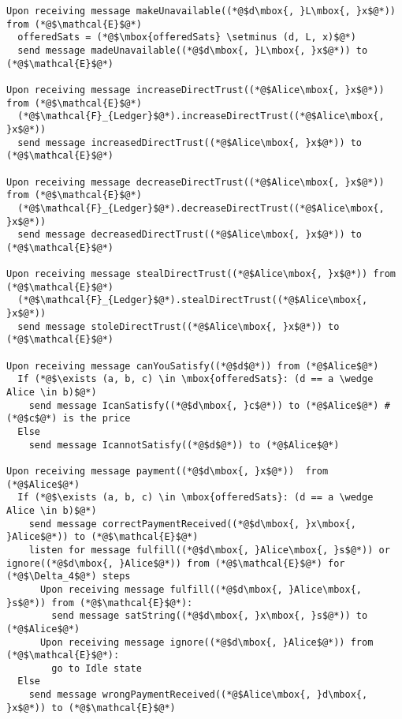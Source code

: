 \begin{lstlisting}[label=protocol, style=numbers]
Upon receiving message makeUnavailable((*@$d\mbox{, }L\mbox{, }x$@*)) from (*@$\mathcal{E}$@*)
  offeredSats = (*@$\mbox{offeredSats} \setminus (d, L, x)$@*)
  send message madeUnavailable((*@$d\mbox{, }L\mbox{, }x$@*)) to (*@$\mathcal{E}$@*)

Upon receiving message increaseDirectTrust((*@$Alice\mbox{, }x$@*)) from (*@$\mathcal{E}$@*)
  (*@$\mathcal{F}_{Ledger}$@*).increaseDirectTrust((*@$Alice\mbox{, }x$@*))
  send message increasedDirectTrust((*@$Alice\mbox{, }x$@*)) to (*@$\mathcal{E}$@*)

Upon receiving message decreaseDirectTrust((*@$Alice\mbox{, }x$@*)) from (*@$\mathcal{E}$@*)
  (*@$\mathcal{F}_{Ledger}$@*).decreaseDirectTrust((*@$Alice\mbox{, }x$@*))
  send message decreasedDirectTrust((*@$Alice\mbox{, }x$@*)) to (*@$\mathcal{E}$@*)

Upon receiving message stealDirectTrust((*@$Alice\mbox{, }x$@*)) from (*@$\mathcal{E}$@*)
  (*@$\mathcal{F}_{Ledger}$@*).stealDirectTrust((*@$Alice\mbox{, }x$@*))
  send message stoleDirectTrust((*@$Alice\mbox{, }x$@*)) to (*@$\mathcal{E}$@*)

Upon receiving message canYouSatisfy((*@$d$@*)) from (*@$Alice$@*)
  If (*@$\exists (a, b, c) \in \mbox{offeredSats}: (d == a \wedge Alice \in b)$@*)
    send message IcanSatisfy((*@$d\mbox{, }c$@*)) to (*@$Alice$@*) # (*@$c$@*) is the price
  Else
    send message IcannotSatisfy((*@$d$@*)) to (*@$Alice$@*)

Upon receiving message payment((*@$d\mbox{, }x$@*))  from (*@$Alice$@*)
  If (*@$\exists (a, b, c) \in \mbox{offeredSats}: (d == a \wedge Alice \in b)$@*)
    send message correctPaymentReceived((*@$d\mbox{, }x\mbox{, }Alice$@*)) to (*@$\mathcal{E}$@*)
    listen for message fulfill((*@$d\mbox{, }Alice\mbox{, }s$@*)) or ignore((*@$d\mbox{, }Alice$@*)) from (*@$\mathcal{E}$@*) for (*@$\Delta_4$@*) steps
      Upon receiving message fulfill((*@$d\mbox{, }Alice\mbox{, }s$@*)) from (*@$\mathcal{E}$@*):
        send message satString((*@$d\mbox{, }x\mbox{, }s$@*)) to (*@$Alice$@*)
      Upon receiving message ignore((*@$d\mbox{, }Alice$@*)) from (*@$\mathcal{E}$@*):
        go to Idle state
  Else
    send message wrongPaymentReceived((*@$Alice\mbox{, }d\mbox{, }x$@*)) to (*@$\mathcal{E}$@*)
\end{lstlisting}
